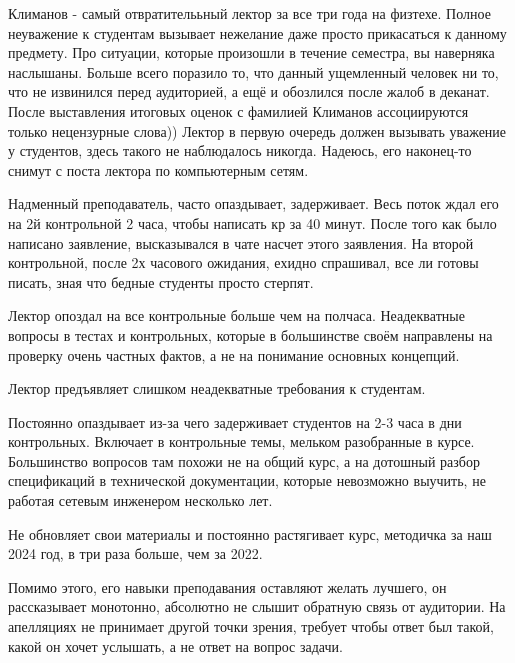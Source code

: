             \begin{commentbox} 
                Климанов - самый отвратителььный лектор за все три года на физтехе. Полное неуважение к студентам вызывает нежелание даже просто прикасаться к данному предмету. Про ситуации, которые произошли в течение семестра, вы наверняка наслышаны. Больше всего поразило то, что данный ущемленный человек ни то, что не извинился перед аудиторией, а  ещё и обозлился после жалоб в деканат. После выставления итоговых оценок с фамилией Климанов ассоциируются только нецензурные слова)) Лектор в первую очередь должен вызывать уважение у студентов, здесь такого не наблюдалось никогда. Надеюсь, его наконец-то снимут с поста лектора по компьютерным сетям. 
            \end{commentbox} 
        
            \begin{commentbox} 
                Надменный преподаватель, часто опаздывает, задерживает. Весь поток ждал его на 2й контрольной 2 часа, чтобы написать кр за 40 минут. После того как было написано заявление, высказывался в чате насчет этого заявления. На второй контрольной, после 2х часового ожидания, ехидно спрашивал, все ли готовы писать, зная что бедные студенты просто стерпят. 
            \end{commentbox} 
        
            \begin{commentbox} 
                Лектор опоздал на все контрольные больше чем на полчаса. Неадекватные вопросы в тестах и контрольных, которые в большинстве своём направлены на проверку очень частных фактов, а не на понимание основных концепций.  
            \end{commentbox} 
        
            \begin{commentbox} 
                Лектор предъявляет слишком неадекватные требования к студентам. 
        
                Постоянно опаздывает из-за чего задерживает студентов на 2-3 часа в дни контрольных. Включает в контрольные темы, мельком разобранные в курсе. Большинство вопросов там похожи не на общий курс, а на дотошный разбор спецификаций в технической документации, которые невозможно выучить, не работая сетевым инженером несколько лет. 
                
                Не обновляет свои материалы и постоянно растягивает курс, методичка за наш 2024 год, в три раза больше, чем за 2022. 
                
                Помимо этого, его навыки преподавания оставляют желать лучшего, он рассказывает монотонно, абсолютно не слышит обратную связь от аудитории. На апелляциях не принимает другой точки зрения, требует чтобы ответ был такой, какой он хочет услышать, а не  ответ на вопрос задачи. 
            \end{commentbox} 
        
